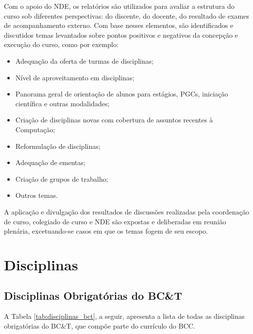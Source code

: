 \documentclass{article}
\begin{document}
Com o apoio do NDE, os relatórios são utilizados para avaliar a estrutura do curso sob diferentes perspectivas: do discente, do docente, do resultado de exames de acompanhamento externo. Com base nesses elementos, são identificados e discutidos temas levantados sobre pontos positivos e negativos da concepção e execução do curso, como por exemplo:
\begin{itemize}
	\item Adequação da oferta de turmas de disciplinas;
	\item Nível de aproveitamento em disciplinas;
	\item Panorama geral de orientação de alunos para estágios, PGCs, iniciação científica e outras modalidades;
	\item Criação de disciplinas novas com cobertura de assuntos recentes à Computação;
	\item Reformulação de disciplinas;
	\item Adequação de ementas;
	\item Criação de grupos de trabalho;
	\item Outros temas.
\end{itemize}

A aplicação e divulgação dos resultados de discussões realizadas pela coordenação de curso, colegiado de curso e NDE são expostas e deliberadas em reunião plenária, excetuando-se casos em que os temas fogem de seu escopo.

\newpage
\section {Disciplinas}

\subsection{Disciplinas Obrigatórias do BC\&T}
A Tabela \ref{tab:disciplinas_bct}, a seguir, apresenta a lista de todas as disciplinas obrigatórias do BC\&T, que compõe parte do currículo do BCC.
\end{document}
